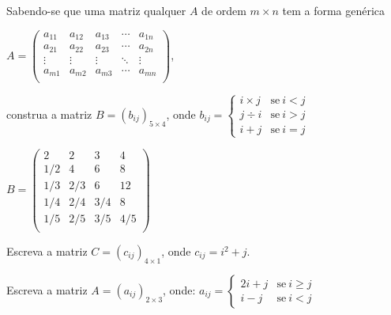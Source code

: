 \documentclass[pdftex, brazil, 12pt, oneside, addpoints]{exam}
\begin{document}
\begin{questions}



\question
Sabendo-se que uma matriz qualquer $A$ de ordem $m \times n$ tem a forma
genérica

$A = \begin{pmatrix}
  a_{11} & a_{12} & a_{13} & \cdots & a_{1n}\\
  a_{21} & a_{22} & a_{23} & \cdots & a_{2n}\\
  \vdots & \vdots & \vdots & \ddots & \vdots\\
  a_{m1} & a_{m2} & a_{m3} & \cdots & a_{mn}\\
\end{pmatrix}$,

construa a matriz $B = (b_{ij})_{5 \times 4}$, onde
$b_{ij} =
    \begin{cases}
      i \times j & \text{se}\ i < j\\
      j \div i   & \text{se}\ i > j\\
      i + j      & \text{se}\ i = j
    \end{cases}
$
\begin{solutionorbox}[1.0in]
$B = \begin{pmatrix}
   2    & 2    & 3    & 4\\
   1/2  & 4    & 6    & 8\\
   1/3  & 2/3  & 6    & 12\\
   1/4  & 2/4  & 3/4  & 8\\
   1/5  & 2/5  & 3/5  & 4/5\\
\end{pmatrix}$
\end{solutionorbox}

\question
Escreva a matriz $C = (c_{ij})_{4 \times 1}$, onde $c_{ij} = i^2 + j$.

\question
Escreva a matriz $A = (a_{ij})_{2 \times 3}$, onde:
$a_{ij} =
    \begin{cases}
      2i + j & \text{se}\ i \ge j\\
      i - j  & \text{se}\ i < j
    \end{cases}
$



\end{questions}
\end{document}
